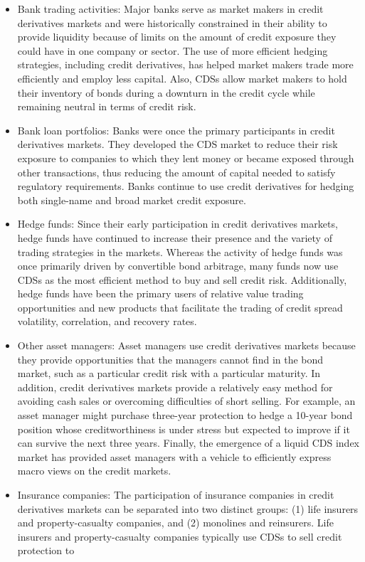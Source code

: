 \documentclass[11pt]{article}
\begin{document}
\begin{itemize}
  \item Bank trading activities: Major banks serve as market makers in credit derivatives markets and were historically constrained in their ability to provide liquidity because of limits on the amount of credit exposure they could have in one company or sector. The use of more efficient hedging strategies, including credit derivatives, has helped market makers trade more efficiently and employ less capital. Also, CDSs allow market makers to hold their inventory of bonds during a downturn in the credit cycle while remaining neutral in terms of credit risk.
  \item Bank loan portfolios: Banks were once the primary participants in credit derivatives markets. They developed the CDS market to reduce their risk exposure to companies to which they lent money or became exposed through other transactions, thus reducing the amount of capital needed to satisfy regulatory requirements. Banks continue to use credit derivatives for hedging both single-name and broad market credit exposure.
  \item Hedge funds: Since their early participation in credit derivatives markets, hedge funds have continued to increase their presence and the variety of trading strategies in the markets. Whereas the activity of hedge funds was once primarily driven by convertible bond arbitrage, many funds now use CDSs as the most efficient method to buy and sell credit risk. Additionally, hedge funds have been the primary users of relative value trading opportunities and new products that facilitate the trading of credit spread volatility, correlation, and recovery rates.
  \item Other asset managers: Asset managers use credit derivatives markets because they provide opportunities that the managers cannot find in the bond market, such as a particular credit risk with a particular maturity. In addition, credit derivatives markets provide a relatively easy method for avoiding cash sales or overcoming difficulties of short selling. For example, an asset manager might purchase three-year protection to hedge a 10-year bond position whose creditworthiness is under stress but expected to improve if it can survive the next three years. Finally, the emergence of a liquid CDS index market has provided asset managers with a vehicle to efficiently express macro views on the credit markets.
  \item Insurance companies: The participation of insurance companies in credit derivatives markets can be separated into two distinct groups: (1) life insurers and property-casualty companies, and (2) monolines and reinsurers. Life insurers and property-casualty companies typically use CDSs to sell credit protection to\\

\end{itemize}
\end{document}

